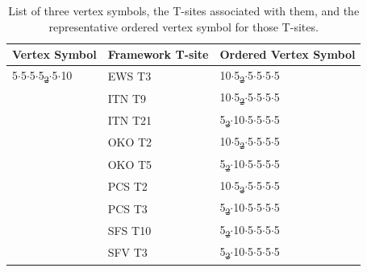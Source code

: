 \documentclass[preprint,numrefs,noinfo,sort&compress]{elsarticle}
\providecommand{\DIFadd}[1]{{\protect\color{blue}\uwave{#1}}} %
\providecommand{\DIFdel}[1]{{\protect\color{red}\sout{#1}}}                      %
\providecommand{\DIFaddend}{} %
\providecommand{\DIFaddFL}[1]{\DIFadd{#1}} %
\providecommand{\DIFdelFL}[1]{\DIFdel{#1}} %
\providecommand{\DIFaddbeginFL}{} %
\providecommand{\DIFaddendFL}{} %
\providecommand{\DIFdelbeginFL}{} %
\providecommand{\DIFdelendFL}{} %
\newcommand{\DIFscaledelfig}{0.5}
\newlength{\DIFdelgraphicswidth} %
\newlength{\DIFdelgraphicsheight} %
\newcommand{\DIFaddincludegraphics}[2][]{{\color{blue}\fbox{\DIFOincludegraphics[#1]{#2}}}} %
\newcommand{\DIFdelincludegraphics}[2][]{%
\sbox{\DIFdelgraphicsbox}{\DIFOincludegraphics[#1]{#2}}%
\settoboxwidth{\DIFdelgraphicswidth}{\DIFdelgraphicsbox} %
\settoboxtotalheight{\DIFdelgraphicsheight}{\DIFdelgraphicsbox} %
\scalebox{\DIFscaledelfig}{%
\parbox[b]{\DIFdelgraphicswidth}{\usebox{\DIFdelgraphicsbox}\\[-\baselineskip] \rule{\DIFdelgraphicswidth}{0em}}\llap{\resizebox{\DIFdelgraphicswidth}{\DIFdelgraphicsheight}{%
\setlength{\unitlength}{\DIFdelgraphicswidth}%
\begin{picture}(1,1)%
\thicklines\linethickness{2pt} %
{\color[rgb]{1,0,0}\put(0,0){\framebox(1,1){}}}%
{\color[rgb]{1,0,0}\put(0,0){\line( 1,1){1}}}%
{\color[rgb]{1,0,0}\put(0,1){\line(1,-1){1}}}%
\end{picture}%
}\hspace*{3pt}}} %
} %
\DeclareRobustCommand{\DIFaddend}{\DIFOaddend \let\includegraphics\DIFOincludegraphics} %
\DeclareRobustCommand{\DIFaddbeginFL}{\DIFOaddbeginFL \let\includegraphics\DIFaddincludegraphics} %
\DeclareRobustCommand{\DIFaddendFL}{\DIFOaddendFL \let\includegraphics\DIFOincludegraphics} %
\DeclareRobustCommand{\DIFdelbeginFL}{\DIFOdelbeginFL \let\includegraphics\DIFdelincludegraphics} %
\DeclareRobustCommand{\DIFdelendFL}{\DIFOaddendFL \let\includegraphics\DIFOincludegraphics} %
\begin{document}
\DIFaddend \begin{table}
\centering
\begin{threeparttable}
\caption{List of three vertex symbols, the T-sites associated with them, and the representative ordered vertex symbol for those T-sites. \label{tab:ov}}
{\scriptsize
\begin{tabular}{lll}
\hline
Vertex Symbol & Framework T-site & Ordered Vertex Symbol\\
\hline
5\(\cdot\)5\(\cdot\)5\(\cdot\)5\DIFdelbeginFL \DIFdelFL{\textsubscript{2}\(\cdot\)}\DIFdelendFL \DIFaddbeginFL \DIFaddFL{\(_{\text{2}} \cdot\)}\DIFaddendFL 5\(\cdot\)10 & EWS T3 & 10\(\cdot\)5\DIFdelbeginFL \DIFdelFL{\textsubscript{2}\(\cdot\)}\DIFdelendFL \DIFaddbeginFL \DIFaddFL{\(_{\text{2}} \cdot\)}\DIFaddendFL 5\(\cdot\)5\(\cdot\)5\(\cdot\)5\\
 & ITN T9 & 10\(\cdot\)5\DIFdelbeginFL \DIFdelFL{\textsubscript{2}\(\cdot\)}\DIFdelendFL \DIFaddbeginFL \DIFaddFL{\(_{\text{2}} \cdot\)}\DIFaddendFL 5\(\cdot\)5\(\cdot\)5\(\cdot\)5\\
 & ITN T21 & 5\DIFdelbeginFL \DIFdelFL{\textsubscript{2}\(\cdot\)}\DIFdelendFL \DIFaddbeginFL \DIFaddFL{\(_{\text{2}} \cdot\)}\DIFaddendFL 10\(\cdot\)5\(\cdot\)5\(\cdot\)5\(\cdot\)5\\
 & OKO T2 & 10\(\cdot\)5\DIFdelbeginFL \DIFdelFL{\textsubscript{2}\(\cdot\)}\DIFdelendFL \DIFaddbeginFL \DIFaddFL{\(_{\text{2}} \cdot\)}\DIFaddendFL 5\(\cdot\)5\(\cdot\)5\(\cdot\)5\\
 & OKO T5 & 5\DIFdelbeginFL \DIFdelFL{\textsubscript{2}\(\cdot\)}\DIFdelendFL \DIFaddbeginFL \DIFaddFL{\(_{\text{2}} \cdot\)}\DIFaddendFL 10\(\cdot\)5\(\cdot\)5\(\cdot\)5\(\cdot\)5\\
 & PCS T2 & 10\(\cdot\)5\DIFdelbeginFL \DIFdelFL{\textsubscript{2}\(\cdot\)}\DIFdelendFL \DIFaddbeginFL \DIFaddFL{\(_{\text{2}} \cdot\)}\DIFaddendFL 5\(\cdot\)5\(\cdot\)5\(\cdot\)5\\
 & PCS T3 & 5\DIFdelbeginFL \DIFdelFL{\textsubscript{2}\(\cdot\)}\DIFdelendFL \DIFaddbeginFL \DIFaddFL{\(_{\text{2}} \cdot\)}\DIFaddendFL 10\(\cdot\)5\(\cdot\)5\(\cdot\)5\(\cdot\)5\\
 & SFS T10 & 5\DIFdelbeginFL \DIFdelFL{\textsubscript{2}\(\cdot\)}\DIFdelendFL \DIFaddbeginFL \DIFaddFL{\(_{\text{2}} \cdot\)}\DIFaddendFL 10\(\cdot\)5\(\cdot\)5\(\cdot\)5\(\cdot\)5\\
 & SFV T3 & 5\DIFdelbeginFL \DIFdelFL{\textsubscript{2}\(\cdot\)}\DIFdelendFL \DIFaddbeginFL \DIFaddFL{\(_{\text{2}} \cdot\)}\DIFaddendFL 10\(\cdot\)5\(\cdot\)5\(\cdot\)5\(\cdot\)5\\

\end{tabular}}
\end{threeparttable}
\end{table}
\end{document}
